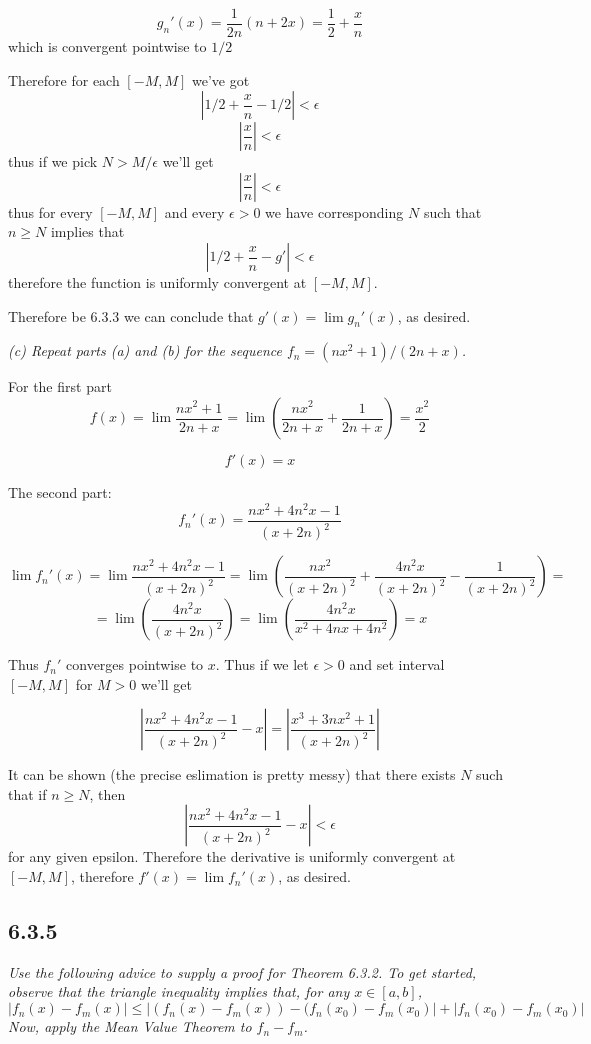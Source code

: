 \documentclass[11pt,oneside,titlepage]{book}
\begin{document}
$$g_n'(x) = \frac{1}{2n}(n + 2x) = \frac{1}{2} + \frac{x}{n}$$
which is convergent pointwise to $1/2$

Therefore for each $[-M, M]$ we've got
$$|1/2 + \frac{x}{n} - 1/2| < \epsilon$$
$$| \frac{x}{n} | < \epsilon$$
thus if we pick $N > M/\epsilon$ we'll get
$$| \frac{x}{n} | < \epsilon$$
thus for every $[-M, M]$ and every $\epsilon > 0$ we have corresponding $N$
such that $n \geq N$ implies that
$$|1/2 + \frac{x}{n} - g'| < \epsilon$$
therefore the function is uniformly convergent at $[-M, M]$.

Therefore be 6.3.3 we can conclude that $g'(x) = \lim g_n'(x)$, as desired.

\textit{(c) Repeat parts (a) and (b) for the sequence
  $f_n = (nx^2 + 1)/(2n + x)$.}

For the first part
$$f(x) = \lim{\frac{nx^2 + 1}{2n + x}} =
\lim{\left(\frac{nx^2}{2n + x} + \frac{1}{2n + x}\right)}
= \frac{x^2}{2}
$$

$$f'(x) = x$$

The second part:
$$f_n'(x) = \frac{nx^2 + 4n^2x - 1}{(x + 2n)^2}$$

$$\lim{f_n'(x)} = \lim{\frac{nx^2 + 4n^2x - 1}{(x + 2n)^2}} =
\lim{\left(\frac{nx^2}{(x + 2n)^2} +
    \frac{4n^2x}{(x + 2n)^2} - \frac{1}{(x + 2n)^2}\right)} =
$$
$$
=
\lim{\left(\frac{4n^2x}{(x + 2n)^2}\right)} =
\lim{\left(\frac{4n^2x}{x^2 + 4nx + 4n^2}\right)} =
x
$$

Thus $f_n'$ converges pointwise to $x$. Thus if we let $\epsilon > 0$
and set interval $[-M, M]$ for $M > 0$ we'll get

$$|\frac{nx^2 + 4n^2x - 1}{(x + 2n)^2} - x| =
|\frac{x^3 + 3nx^2 + 1}{(x + 2n)^2}| 
$$

It can be shown (the precise eslimation is pretty messy) that there exists
$N$ such that if $n \geq N$, then
$$|\frac{nx^2 + 4n^2x - 1}{(x + 2n)^2} - x| < \epsilon$$
for any given epsilon. Therefore the derivative is uniformly convergent at
$[-M, M]$, therefore $f'(x) = \lim f_n'(x)$, as desired.

\subsection*{6.3.5}
\textit{Use the following advice to supply a proof for Theorem 6.3.2. To get
  started, observe that the triangle inequality implies that, for any
  $x \in [a, b]$,}
$$|f_n(x) - f_m(x)| \leq |(f_n(x) - f_m(x)) - (f_n(x_0) - f_m(x_0)| +
|f_n(x_0) - f_m(x_0)|$$
\textit{Now, apply the Mean Value Theorem to $f_n - f_m$.}
\end{document}
